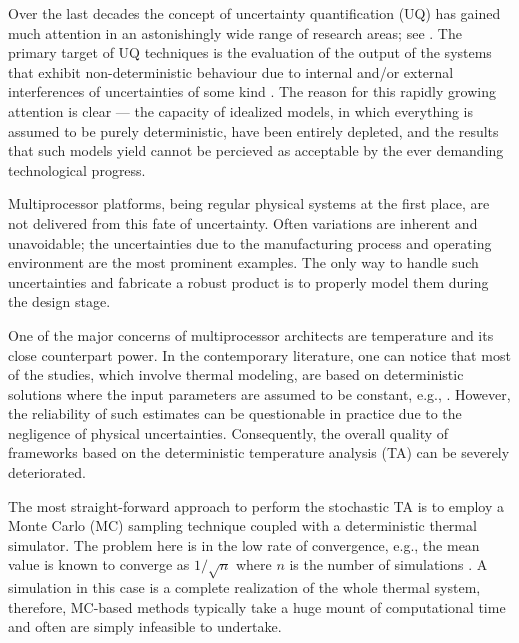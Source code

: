 Over the last decades the concept of uncertainty quantification (UQ) has gained much attention in an astonishingly wide range of research areas; see \cite{xiu2009}. The primary target of UQ techniques is the evaluation of the output of the systems that exhibit non-deterministic behaviour due to internal and/or external interferences of uncertainties of some kind \cite{eldred2009}. The reason for this rapidly growing attention is clear --- the capacity of idealized models, in which everything is assumed to be purely deterministic, have been entirely depleted, and the results that such models yield cannot be percieved as acceptable by the ever demanding technological progress.

Multiprocessor platforms, being regular physical systems at the first place, are not delivered from this fate of uncertainty. Often variations are inherent and unavoidable; the uncertainties due to the manufacturing process and operating environment are the most prominent examples. The only way to handle such uncertainties and fabricate a robust product is to properly model them during the design stage.

One of the major concerns of multiprocessor architects are temperature and its close counterpart power. In the contemporary literature, one can notice that most of the studies, which involve thermal modeling, are based on deterministic solutions where the input parameters are assumed to be constant, e.g., \cite{ukhov2012}. However, the reliability of such estimates can be questionable in practice due to the negligence of physical uncertainties. Consequently, the overall quality of frameworks based on the deterministic temperature analysis (TA) can be severely deteriorated.

The most straight-forward approach to perform the stochastic TA is to employ a Monte Carlo (MC) sampling technique coupled with a deterministic thermal simulator. The problem here is in the low rate of convergence, e.g., the mean value is known to converge as $1/\sqrt{n}$ where $n$ is the number of simulations \cite{xiu2009}. A simulation in this case is a complete realization of the whole thermal system, therefore, MC-based methods typically take a huge mount of computational time and often are simply infeasible to undertake.

